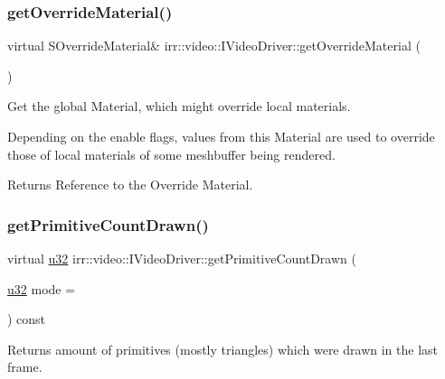 \subsubsection{\texorpdfstring{get\+Override\+Material()}{getOverrideMaterial()}\hspace{0.1cm}{\footnotesize\ttfamily [2/2]}}
{\footnotesize\ttfamily virtual S\+Override\+Material\& irr\+::video\+::\+I\+Video\+Driver\+::get\+Override\+Material (\begin{DoxyParamCaption}{ }\end{DoxyParamCaption})\hspace{0.3cm}{\ttfamily [pure virtual]}}



Get the global Material, which might override local materials. 

Depending on the enable flags, values from this Material are used to override those of local materials of some meshbuffer being rendered. \begin{DoxyReturn}{Returns}
Reference to the Override Material. 
\end{DoxyReturn}
\mbox{\label{classirr_1_1video_1_1IVideoDriver_a2ce9be45cacb4aa034d3afdb489a57a3}} 
\subsubsection{\texorpdfstring{get\+Primitive\+Count\+Drawn()}{getPrimitiveCountDrawn()}\hspace{0.1cm}{\footnotesize\ttfamily [1/2]}}
{\footnotesize\ttfamily virtual \hyperlink{namespaceirr_a0416a53257075833e7002efd0a18e804}{u32} irr\+::video\+::\+I\+Video\+Driver\+::get\+Primitive\+Count\+Drawn (\begin{DoxyParamCaption}\item[{\hyperlink{namespaceirr_a0416a53257075833e7002efd0a18e804}{u32}}]{mode = {} }\end{DoxyParamCaption}) const\hspace{0.3cm}{\ttfamily [pure virtual]}}



Returns amount of primitives (mostly triangles) which were drawn in the last frame. 

